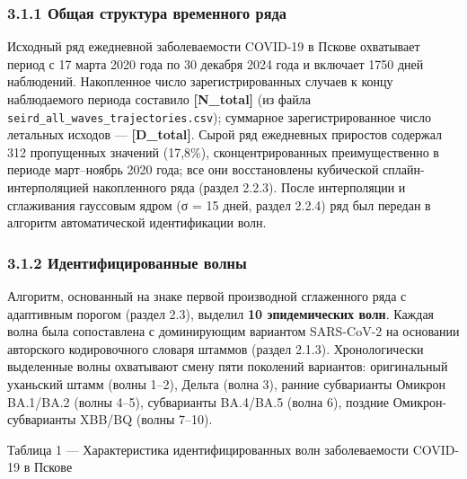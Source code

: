 \documentclass[12pt]{article}
\begin{document}
\subsubsection{3.1.1 Общая структура временного
ряда}\label{ux43eux431ux449ux430ux44f-ux441ux442ux440ux443ux43aux442ux443ux440ux430-ux432ux440ux435ux43cux435ux43dux43dux43eux433ux43e-ux440ux44fux434ux430}

Исходный ряд ежедневной заболеваемости COVID-19 в Пскове охватывает
период с 17 марта 2020 года по 30 декабря 2024 года и включает 1750 дней
наблюдений. Накопленное число зарегистрированных случаев к концу
наблюдаемого периода составило \textbf{{[}N\_total{]}} (из файла
\texttt{seird\_all\_waves\_trajectories.csv}); суммарное
зарегистрированное число летальных исходов --- \textbf{{[}D\_total{]}}.
Сырой ряд ежедневных приростов содержал 312 пропущенных значений
(17,8\%), сконцентрированных преимущественно в периоде март--ноябрь 2020
года; все они восстановлены кубической сплайн-интерполяцией накопленного
ряда (раздел 2.2.3). После интерполяции и сглаживания гауссовым ядром (σ
= 15 дней, раздел 2.2.4) ряд был передан в алгоритм автоматической
идентификации волн.

\subsubsection{3.1.2 Идентифицированные
волны}\label{ux438ux434ux435ux43dux442ux438ux444ux438ux446ux438ux440ux43eux432ux430ux43dux43dux44bux435-ux432ux43eux43bux43dux44b}

Алгоритм, основанный на знаке первой производной сглаженного ряда с
адаптивным порогом (раздел 2.3), выделил \textbf{10 эпидемических волн}.
Каждая волна была сопоставлена с доминирующим вариантом SARS-CoV-2 на
основании авторского кодировочного словаря штаммов (раздел 2.1.3).
Хронологически выделенные волны охватывают смену пяти поколений
вариантов: оригинальный уханьский штамм (волны 1--2), Дельта (волна 3),
ранние субварианты Омикрон BA.1/BA.2 (волны 4--5), субварианты BA.4/BA.5
(волна 6), поздние Омикрон-субварианты XBB/BQ (волны 7--10).

Таблица 1 --- Характеристика идентифицированных волн заболеваемости
COVID-19 в Пскове
\end{document}
